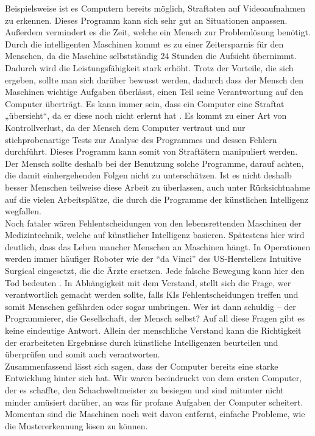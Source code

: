 Beispielsweise ist es Computern bereits möglich, Straftaten auf Videoaufnahmen zu erkennen. Dieses Programm kann sich sehr gut an Situationen anpassen. Außerdem vermindert es die Zeit, welche ein Mensch zur Problemlösung benötigt. Durch die intelligenten Maschinen kommt es zu einer Zeitersparnis für den Menschen, da die Maschine selbstständig 24 Stunden die Aufsicht übernimmt. Dadurch wird die Leistungsfähigkeit stark erhöht. Trotz der Vorteile, die sich ergeben, sollte man sich darüber bewusst werden, dadurch dass der Mensch den Maschinen wichtige Aufgaben überlässt, einen Teil seine Verantwortung auf den Computer überträgt. Es kann immer sein, dass ein Computer eine Straftat „übersieht“, da er diese noch nicht erlernt hat \cite{UniversitaetHamburg_1}. Es kommt zu einer Art von Kontrollverlust, da der Mensch dem Computer vertraut und nur stichprobenartige Tests zur Analyse des Programmes und dessen Fehlern durchführt. Dieses Programm kann somit von Straftätern manipuliert werden. Der Mensch sollte deshalb bei der Benutzung solche Programme, darauf achten, die damit einhergehenden Folgen nicht zu unterschätzen. Ist es nicht deshalb besser Menschen teilweise diese Arbeit zu überlassen, auch unter Rücksichtnahme auf die vielen Arbeitsplätze, die durch die Programme der künstlichen Intelligenz wegfallen. \\
%

Noch fataler wären Fehlentscheidungen von den lebensrettenden Maschinen der Medizintechnik, welche auf künstlicher Intelligenz basieren. Spätestens hier wird deutlich, dass das Leben mancher Menschen an Maschinen hängt.  In Operationen werden immer häufiger Roboter wie der \enquote{da Vinci} des US-Herstellers Intuitive Surgical eingesetzt, die die Ärzte ersetzen. Jede falsche Bewegung kann hier den Tod bedeuten \cite{Spiegel_1}.
In Abhängigkeit mit dem Verstand, stellt sich die Frage, wer verantwortlich gemacht werden sollte, falls KIs Fehlentscheidungen treffen und somit Menschen gefährden oder sogar umbringen. Wer ist dann schuldig – der Programmierer, die Gesellschaft, der Mensch selbst? Auf all diese Fragen gibt es keine eindeutige Antwort. Allein der menschliche Verstand kann die Richtigkeit der erarbeiteten Ergebnisse durch künstliche Intelligenzen beurteilen und überprüfen und somit auch verantworten. \\
%

Zusammenfassend lässt sich sagen, dass der Computer bereits eine starke Entwicklung hinter sich hat. Wir waren beeindruckt von dem ersten Computer, der es schaffte, den Schachweltmeister zu besiegen und sind mitunter nicht minder amüsiert darüber, an was für profane Aufgaben der Computer scheitert. Momentan sind die Maschinen noch weit davon entfernt, einfache Probleme, wie die Mustererkennung lösen zu können.\\
%


